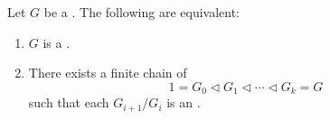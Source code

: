 \begin{proposition} \label{proposition:equivalent_formulations_of_solvable_groups}
Let $G$ be a . The following are equivalent:

\begin{enumerate}
    \item $G$ is a .

    \item There exists a finite chain of 
    $$1 = G_0 \triangleleft G_1 \triangleleft \cdots \triangleleft G_k = G$$
    such that each  $G_{i+1}/G_i$ is an .
\end{enumerate}
\end{proposition}
